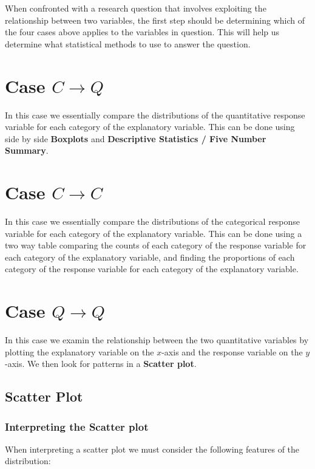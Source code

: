 \documentclass[12pt letter]{report}
\begin{document}
When confronted with a research question that involves exploiting the relationship between two variables, the first step
should be determining which of the four cases above applies to the variables in question. This will help us determine
what statistical methods to use to answer the question.

\section{Case $C \to Q$ }

In this case we essentially compare the distributions of the quantitative response variable for each category of the
explanatory variable. This can be done using side by side \textbf{Boxplots} and  \textbf{Descriptive Statistics / Five
	Number Summary}.


\section{Case $C \to C$ }

In this case we essentially compare the distributions of the categorical response variable for each category of the
explanatory variable. This can be done using a two way table comparing the counts of each category of the response
variable for each category of the explanatory variable, and finding the proportions of each category of the response variable for each category of the explanatory variable.

\section{Case $Q \to Q$}

In this case we examin the relationship between the two quantitative variables by plotting the explanatory variable on
the $x$-axis and the response variable on the $y$-axis. We then look for patterns in a \textbf{Scatter plot}.

\subsection{Scatter Plot}

\subsubsection{Interpreting the Scatter plot}

When interpreting a scatter plot we must consider the following features of the distribution:
\end{document}
